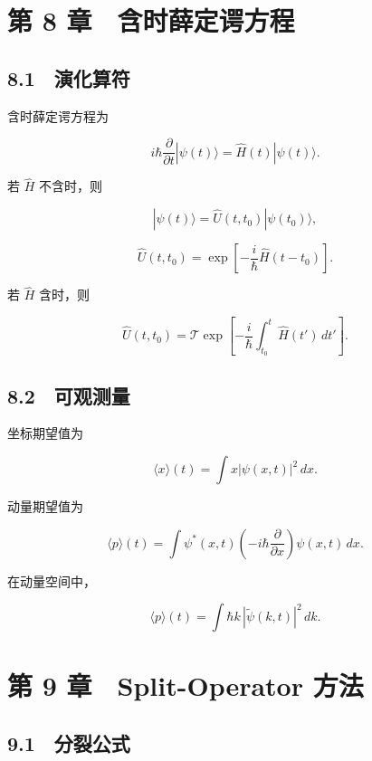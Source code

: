 \documentclass[
  a4paper,
]{ctexbook}
\begin{document}
\hypertarget{ux7b2c-8-ux7ae0-ux542bux65f6ux859bux5b9aux8c14ux65b9ux7a0b}{%
\section{第 8
章　含时薛定谔方程}\label{ux7b2c-8-ux7ae0-ux542bux65f6ux859bux5b9aux8c14ux65b9ux7a0b}}

\hypertarget{ux6f14ux5316ux7b97ux7b26-1}{%
\subsection{8.1　演化算符}\label{ux6f14ux5316ux7b97ux7b26-1}}

含时薛定谔方程为

\[
i\hbar\frac{\partial}{\partial t}|\psi(t)\rangle
=
\hat H(t)|\psi(t)\rangle.
\]

若 \(\hat H\) 不含时，则

\[
|\psi(t)\rangle
=
\hat U(t,t_0)|\psi(t_0)\rangle,
\]

\[
\hat U(t,t_0)
=
\exp\left[-\frac{i}{\hbar}\hat H(t-t_0)\right].
\]

若 \(\hat H\) 含时，则

\[
\hat U(t,t_0)
=
\mathcal{T}
\exp\left[
-\frac{i}{\hbar}
\int_{t_0}^{t}\hat H(t')\,dt'
\right].
\]

\hypertarget{ux53efux89c2ux6d4bux91cf}{%
\subsection{8.2　可观测量}\label{ux53efux89c2ux6d4bux91cf}}

坐标期望值为

\[
\langle x\rangle(t)
=
\int x|\psi(x,t)|^2\,dx.
\]

动量期望值为

\[
\langle p\rangle(t)
=
\int \psi^{*}(x,t)
\left(-i\hbar\frac{\partial}{\partial x}\right)
\psi(x,t)\,dx.
\]

在动量空间中，

\[
\langle p\rangle(t)
=
\int \hbar k\,|\tilde\psi(k,t)|^2\,dk.
\]

\hypertarget{ux7b2c-9-ux7ae0-split-operator-ux65b9ux6cd5}{%
\section{第 9 章　Split-Operator
方法}\label{ux7b2c-9-ux7ae0-split-operator-ux65b9ux6cd5}}

\hypertarget{ux5206ux88c2ux516cux5f0f}{%
\subsection{9.1　分裂公式}\label{ux5206ux88c2ux516cux5f0f}}
\end{document}
